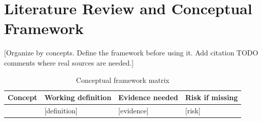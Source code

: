 \section{Literature Review and Conceptual Framework}

[Organize by concepts. Define the framework before using it. Add citation TODO comments where real sources are needed.]

\begin{table}[htbp]
\centering
\caption{Conceptual framework matrix}
\begin{tabularx}{\textwidth}{P{3cm}Y Y Y}
\toprule
\textbf{Concept} & \textbf{Working definition} & \textbf{Evidence needed} & \textbf{Risk if missing} \\
\midrule
[concept] & [definition] & [evidence] & [risk] \\
\bottomrule
\end{tabularx}
\end{table}
